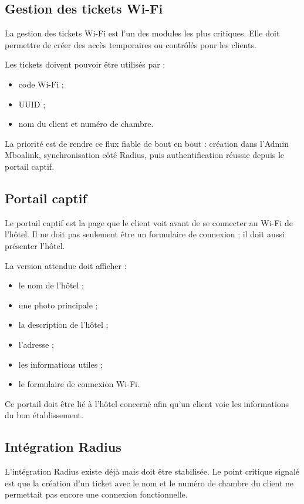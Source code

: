 \documentclass[12pt,a4paper]{article}
\begin{document}
\subsection{Gestion des tickets Wi-Fi}

La gestion des tickets Wi-Fi est l'un des modules les plus critiques. Elle doit permettre de créer des accès temporaires ou contrôlés pour les clients.

Les tickets doivent pouvoir être utilisés par :

\begin{itemize}
  \item code Wi-Fi ;
  \item UUID ;
  \item nom du client et numéro de chambre.
\end{itemize}

La priorité est de rendre ce flux fiable de bout en bout : création dans l'Admin Mboalink, synchronisation côté Radius, puis authentification réussie depuis le portail captif.

\subsection{Portail captif}

Le portail captif est la page que le client voit avant de se connecter au Wi-Fi de l'hôtel. Il ne doit pas seulement être un formulaire de connexion ; il doit aussi présenter l'hôtel.

La version attendue doit afficher :

\begin{itemize}
  \item le nom de l'hôtel ;
  \item une photo principale ;
  \item la description de l'hôtel ;
  \item l'adresse ;
  \item les informations utiles ;
  \item le formulaire de connexion Wi-Fi.
\end{itemize}

Ce portail doit être lié à l'hôtel concerné afin qu'un client voie les informations du bon établissement.

\subsection{Intégration Radius}

L'intégration Radius existe déjà mais doit être stabilisée. Le point critique signalé est que la création d'un ticket avec le nom et le numéro de chambre du client ne permettait pas encore une connexion fonctionnelle.
\end{document}

